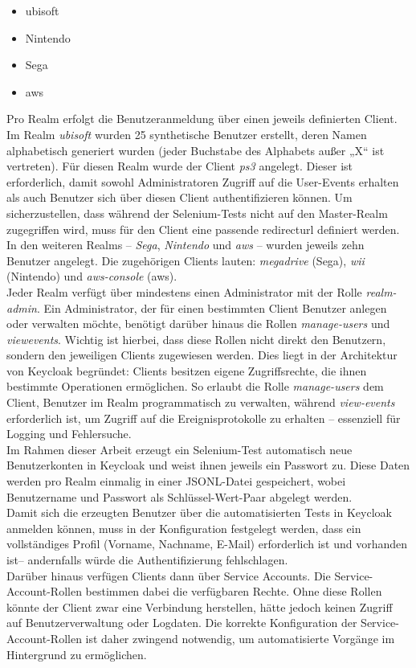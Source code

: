 \documentclass[a4paper,12pt]{article}
\begin{document}
	\begin{itemize}
		\item ubisoft
		\item Nintendo
		\item Sega
		\item aws
	\end{itemize}
	Pro Realm erfolgt die Benutzeranmeldung über einen jeweils definierten Client.
	\\[0.5em]
	Im Realm \textit{ubisoft} wurden 25 synthetische Benutzer erstellt, deren Namen alphabetisch generiert wurden (jeder Buchstabe des Alphabets außer „X“ ist vertreten). Für diesen Realm wurde der Client \textit{ps3} angelegt. Dieser ist erforderlich, damit sowohl Administratoren Zugriff auf die User-Events erhalten als auch Benutzer sich über diesen Client authentifizieren können. Um sicherzustellen, dass während der Selenium-Tests nicht auf den Master-Realm zugegriffen wird, muss für den Client eine passende \gls{redirecturl} definiert werden.
	\\[0.5em]
	In den weiteren Realms – \textit{Sega}, \textit{Nintendo} und \textit{aws} – wurden jeweils zehn Benutzer angelegt. Die zugehörigen Clients lauten: \textit{megadrive} (Sega), \textit{wii} (Nintendo) und \textit{aws-console} (aws).
	\\[0.5em]
	Jeder Realm verfügt über mindestens einen Administrator mit der Rolle \textit{realm-admin}. Ein Administrator, der für einen bestimmten Client Benutzer anlegen oder verwalten möchte, benötigt darüber hinaus die Rollen \textit{manage-users} und \textit{\gls{viewevents}}. Wichtig ist hierbei, dass diese Rollen nicht direkt den Benutzern, sondern den jeweiligen Clients zugewiesen werden. Dies liegt in der Architektur von Keycloak begründet: Clients besitzen eigene Zugriffsrechte, die ihnen bestimmte Operationen ermöglichen. So erlaubt die Rolle \textit{manage-users} dem Client, Benutzer im Realm programmatisch zu verwalten, während \textit{view-events} erforderlich ist, um Zugriff auf die Ereignisprotokolle zu erhalten – essenziell für Logging und Fehlersuche.
	\\[0.5em]
	Im Rahmen dieser Arbeit erzeugt ein Selenium-Test automatisch neue Benutzerkonten in Keycloak und weist ihnen jeweils ein Passwort zu. Diese Daten werden pro Realm einmalig in einer JSONL-Datei gespeichert, wobei Benutzername und Passwort als Schlüssel-Wert-Paar abgelegt werden.
	\\[0.5em]
	Damit sich die erzeugten Benutzer über die automatisierten Tests in Keycloak anmelden können, muss in der Konfiguration festgelegt werden, dass ein vollständiges Profil (Vorname, Nachname, E-Mail) erforderlich ist und vorhanden ist– andernfalls würde die Authentifizierung fehlschlagen.
	\\[0.5em]
	Darüber hinaus verfügen Clients dann über Service Accounts. Die Service-Account-Rollen bestimmen dabei die verfügbaren Rechte. Ohne diese Rollen könnte der Client zwar eine Verbindung herstellen, hätte jedoch keinen Zugriff auf Benutzerverwaltung oder Logdaten. Die korrekte Konfiguration der Service-Account-Rollen ist daher zwingend notwendig, um automatisierte Vorgänge im Hintergrund zu ermöglichen.
	
\end{document}
